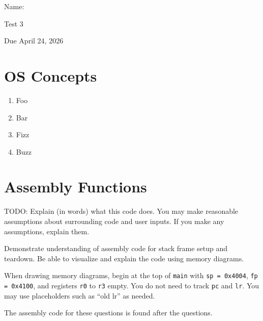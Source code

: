 \documentclass[12pt]{article}
\begin{document}
Name: \makebox[3in]{\hrulefill
\hrulefill}

\vfill

\begin{center}
{\huge Test 3}

{\large Due April 24, 2026}
\end{center}

\testrules

\vfill

\pledge

\newpage

\section*{OS Concepts}

\begin{enumerate}

\item Foo
\vfill

\item Bar
\vfill

\newpage

\item Fizz
\vfill

\item Buzz
\vfill

\end{enumerate}

\standardsfooter

\newpage

\section*{Assembly Functions}


TODO: Explain (in words) what this code does. You may make reasonable assumptions about surrounding code and user inputs. If you make any assumptions, explain them. 






Demonstrate understanding of assembly code for stack frame setup and teardown. Be able to visualize and explain the code using memory diagrams. 

When drawing memory diagrams, begin at the top of \texttt{main} with \texttt{sp = 0x4004}, \texttt{fp = 0x4100}, and registers \texttt{r0} to \texttt{r3} empty. You do not need to track \texttt{pc} and \texttt{lr}. You may use placeholders such as ``old lr'' as needed.

The assembly code for these questions is found after the questions. 
\end{document}
